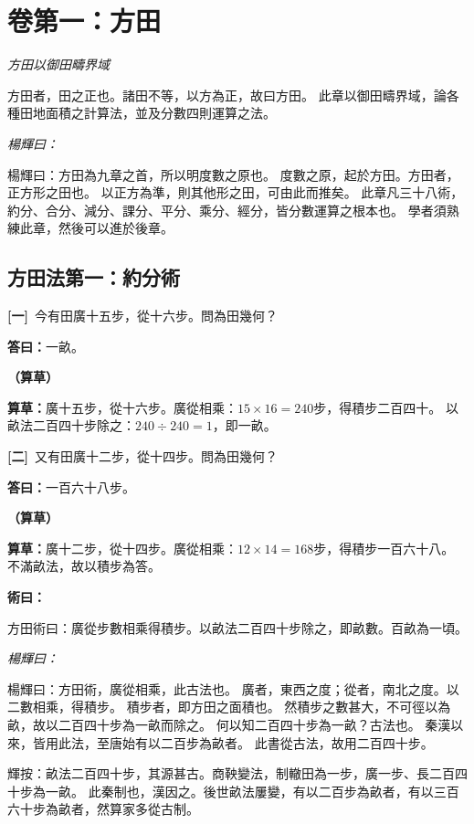 \documentclass[11pt,a4paper]{article}
\newenvironment{method}{%
  \par\noindent\textcolor{methodcolor}{\textbf{術曰：}}%
  \ignorespaces
}{\par\vspace{0.5em}}
\newenvironment{caocao}{%
  \par\noindent\textcolor{caocaocolor}{\small\textbf{（算草）}}%
  \ignorespaces
}{\par\vspace{0.5em}}
\newenvironment{yanghuicomment}{%
  \par\noindent\textcolor{commentarycolor}{\small\textit{楊輝曰：}}%
  \ignorespaces
}{\par\vspace{0.5em}}
\newcommand{\problemnum}[1]{\textbf{[\ignorespaces#1\unskip]}}
\begin{document}
\newpage

\section{卷第一：方田}
\label{sec:fangtian}

\begin{center}
\textit{方田以御田疇界域}
\end{center}

方田者，田之正也。諸田不等，以方為正，故曰方田。
此章以御田疇界域，論各種田地面積之計算法，並及分數四則運算之法。

\begin{yanghuicomment}
楊輝曰：方田為九章之首，所以明度數之原也。
度數之原，起於方田。方田者，正方形之田也。
以正方為準，則其他形之田，可由此而推矣。
此章凡三十八術，約分、合分、減分、課分、平分、乘分、經分，皆分數運算之根本也。
學者須熟練此章，然後可以進於後章。
\end{yanghuicomment}

\subsection{方田法第一：約分術}

\noindent\problemnum{一}\,
今有田廣十五步，從十六步。問為田幾何？

\noindent\textcolor{answercolor}{\textbf{答曰：}}一畝。

\begin{caocao}
\textbf{算草：}廣十五步，從十六步。廣從相乘：$15 \times 16 = 240$步，得積步二百四十。
以畝法二百四十步除之：$240 \div 240 = 1$，即一畝。
\end{caocao}

\noindent\problemnum{二}\,
又有田廣十二步，從十四步。問為田幾何？

\noindent\textcolor{answercolor}{\textbf{答曰：}}一百六十八步。

\begin{caocao}
\textbf{算草：}廣十二步，從十四步。廣從相乘：$12 \times 14 = 168$步，得積步一百六十八。
不滿畝法，故以積步為答。
\end{caocao}

\begin{method}
方田術曰：廣從步數相乘得積步。以畝法二百四十步除之，即畝數。百畝為一頃。
\end{method}

\begin{yanghuicomment}
楊輝曰：方田術，廣從相乘，此古法也。
廣者，東西之度；從者，南北之度。以二數相乘，得積步。
積步者，即方田之面積也。
然積步之數甚大，不可徑以為畝，故以二百四十步為一畝而除之。
何以知二百四十步為一畝？古法也。
秦漢以來，皆用此法，至唐始有以二百步為畝者。
此書從古法，故用二百四十步。

輝按：畝法二百四十步，其源甚古。商鞅變法，制轍田為一步，廣一步、長二百四十步為一畝。
此秦制也，漢因之。後世畝法屢變，有以二百步為畝者，有以三百六十步為畝者，然算家多從古制。
\end{yanghuicomment}
\end{document}
